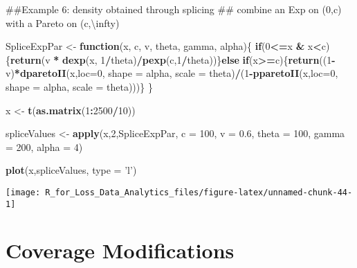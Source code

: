 \documentclass[]{book}
\newenvironment{Shaded}{\begin{snugshade}}{\end{snugshade}}
\newcommand{\KeywordTok}[1]{\textcolor[rgb]{0.13,0.29,0.53}{\textbf{#1}}}
\newcommand{\DataTypeTok}[1]{\textcolor[rgb]{0.13,0.29,0.53}{#1}}
\newcommand{\DecValTok}[1]{\textcolor[rgb]{0.00,0.00,0.81}{#1}}
\newcommand{\FloatTok}[1]{\textcolor[rgb]{0.00,0.00,0.81}{#1}}
\newcommand{\StringTok}[1]{\textcolor[rgb]{0.31,0.60,0.02}{#1}}
\newcommand{\ControlFlowTok}[1]{\textcolor[rgb]{0.13,0.29,0.53}{\textbf{#1}}}
\newcommand{\OperatorTok}[1]{\textcolor[rgb]{0.81,0.36,0.00}{\textbf{#1}}}
\newcommand{\NormalTok}[1]{#1}
\theoremstyle{definition}
\theoremstyle{definition}
\theoremstyle{definition}
\theoremstyle{remark}
\begin{document}
\begin{Shaded}
\begin{Highlighting}[]
\NormalTok{##Example 6: density obtained through splicing}
\NormalTok{## combine an Exp on (0,c) with a Pareto on (c,\textbackslash{}infty)}

\NormalTok{SpliceExpPar <-}\StringTok{ }\ControlFlowTok{function}\NormalTok{(x, c, v, theta, gamma, alpha)\{}
  \ControlFlowTok{if}\NormalTok{(}\DecValTok{0}\OperatorTok{<=}\NormalTok{x }\OperatorTok{&}\StringTok{ }\NormalTok{x}\OperatorTok{<}\NormalTok{c)\{}\KeywordTok{return}\NormalTok{(v }\OperatorTok{*}\StringTok{ }\KeywordTok{dexp}\NormalTok{(x, }\DecValTok{1}\OperatorTok{/}\NormalTok{theta)}\OperatorTok{/}\KeywordTok{pexp}\NormalTok{(c,}\DecValTok{1}\OperatorTok{/}\NormalTok{theta))\}}\ControlFlowTok{else}
    \ControlFlowTok{if}\NormalTok{(x}\OperatorTok{>=}\NormalTok{c)\{}\KeywordTok{return}\NormalTok{((}\DecValTok{1}\OperatorTok{-}\NormalTok{v)}\OperatorTok{*}\KeywordTok{dparetoII}\NormalTok{(x,}\DataTypeTok{loc=}\DecValTok{0}\NormalTok{, }\DataTypeTok{shape =}\NormalTok{ alpha, }\DataTypeTok{scale =}\NormalTok{ theta)}\OperatorTok{/}\NormalTok{(}\DecValTok{1}\OperatorTok{-}\KeywordTok{pparetoII}\NormalTok{(x,}\DataTypeTok{loc=}\DecValTok{0}\NormalTok{, }\DataTypeTok{shape =}\NormalTok{ alpha, }\DataTypeTok{scale =}\NormalTok{ theta)))\}}
\NormalTok{\}}

\NormalTok{x <-}\StringTok{ }\KeywordTok{t}\NormalTok{(}\KeywordTok{as.matrix}\NormalTok{(}\DecValTok{1}\OperatorTok{:}\DecValTok{2500}\OperatorTok{/}\DecValTok{10}\NormalTok{))}

\NormalTok{spliceValues <-}\StringTok{ }\KeywordTok{apply}\NormalTok{(x,}\DecValTok{2}\NormalTok{,SpliceExpPar, }\DataTypeTok{c =} \DecValTok{100}\NormalTok{, }\DataTypeTok{v =} \FloatTok{0.6}\NormalTok{, }\DataTypeTok{theta =} \DecValTok{100}\NormalTok{, }\DataTypeTok{gamma =} \DecValTok{200}\NormalTok{, }\DataTypeTok{alpha =} \DecValTok{4}\NormalTok{)}

\KeywordTok{plot}\NormalTok{(x,spliceValues, }\DataTypeTok{type =} \StringTok{'l'}\NormalTok{)}
\end{Highlighting}
\end{Shaded}

\begin{center}\texttt{[image: R\_for\_Loss\_Data\_Analytics\_files/figure-latex/unnamed-chunk-44-1]} \end{center}

\section{Coverage Modifications}\label{coverage-modifications}
\end{document}
